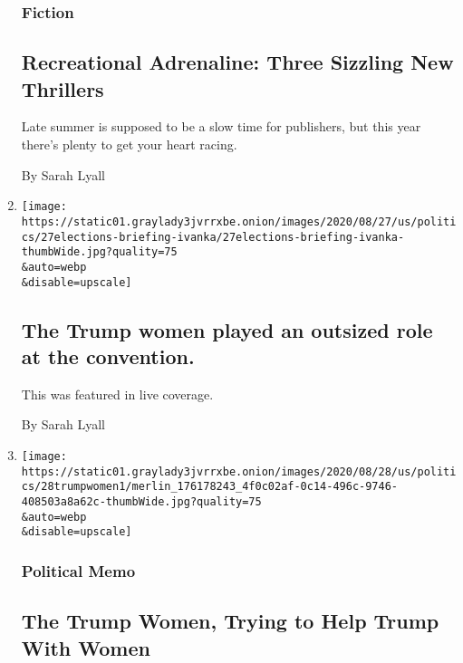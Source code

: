 \begin{enumerate}
  \hypertarget{fiction}{%
  \subsubsection{Fiction}\label{fiction}}

  \hypertarget{recreational-adrenaline-three-sizzling-new-thrillers}{%
  \subsection{Recreational Adrenaline: Three Sizzling New
  Thrillers}\label{recreational-adrenaline-three-sizzling-new-thrillers}}

  Late summer is supposed to be a slow time for publishers, but this
  year there's plenty to get your heart racing.

  By Sarah Lyall
\item
  \href{/live/2020/08/28/us/trump-vs-biden/the-trump-women-played-an-outsized-role-at-the-convention}{}

  \texttt{[image: https://static01.graylady3jvrrxbe.onion/images/2020/08/27/us/politics/27elections-briefing-ivanka/27elections-briefing-ivanka-thumbWide.jpg?quality=75\\\&auto=webp\\\&disable=upscale]}

  \hypertarget{the-trump-women-played-an-outsized-role-at-the-convention}{%
  \subsection{The Trump women played an outsized role at the
  convention.}\label{the-trump-women-played-an-outsized-role-at-the-convention}}

  This was featured in live coverage.

  By Sarah Lyall
\item
  \href{/2020/08/28/us/politics/tiffany-trump-kimberly-guilfoyle-rnc.html}{}

  \texttt{[image: https://static01.graylady3jvrrxbe.onion/images/2020/08/28/us/politics/28trumpwomen1/merlin\_176178243\_4f0c02af-0c14-496c-9746-408503a8a62c-thumbWide.jpg?quality=75\\\&auto=webp\\\&disable=upscale]}

  \hypertarget{political-memo-1}{%
  \subsubsection{Political Memo}\label{political-memo-1}}

  \hypertarget{the-trump-women-trying-to-help-trump-with-women}{%
  \subsection{The Trump Women, Trying to Help Trump With
  Women}\label{the-trump-women-trying-to-help-trump-with-women}}


\end{enumerate}

